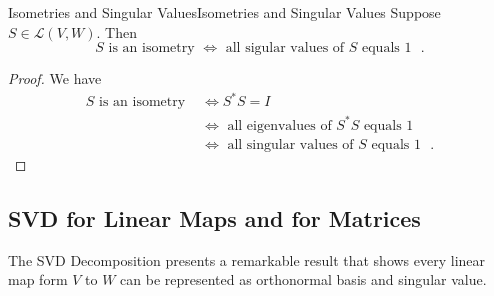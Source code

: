 \documentclass[../main.tex]{subfiles}
\begin{document}
\begin{theorem}{Isometries and Singular Values}{Isometries and Singular Values}
Suppose $S\in \mathscr{L}(V,W)$. Then
\begin{equation*}
S \text{ is an isometry } \Leftrightarrow \text{ all sigular values of $S$ equals $1$ }.
\end{equation*}
\end{theorem}
\begin{proof}
We have 
\begin{equation*}
\begin{aligned}
	S \text{ is an isometry } & \Leftrightarrow S^*S = I\\
  & \Leftrightarrow  \text{ all eigenvalues of $S^*S$ equals $1$ }\\
  & \Leftrightarrow  \text{ all singular values of $S$ equals $1$ }.
\end{aligned}
\end{equation*}
\end{proof}



\subsection{SVD for Linear Maps and for Matrices}
The SVD Decomposition presents a remarkable result that shows every linear map form $V$ to $W$ can be represented as orthonormal basis and singular value.
\end{document}
